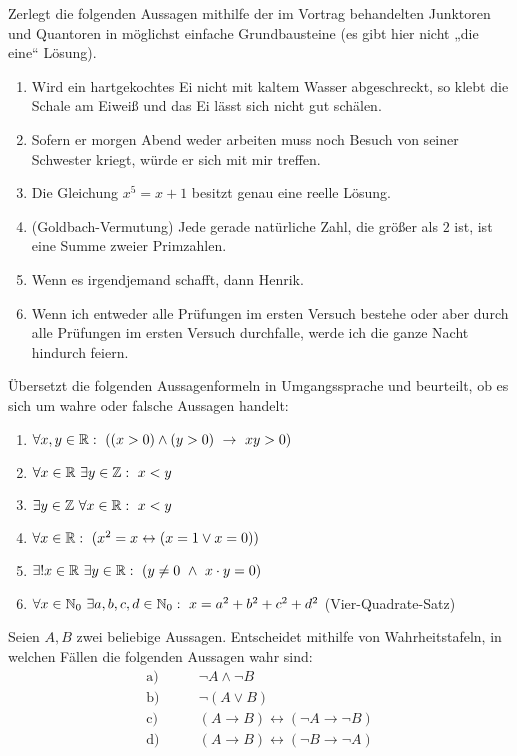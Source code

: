 \begin{aufg}
    Zerlegt die folgenden Aussagen mithilfe der im Vortrag behandelten Junktoren und Quantoren in möglichst einfache Grundbausteine (es gibt hier nicht „die eine“ Lösung).
    \begin{enumerate}
        \item Wird ein hartgekochtes Ei nicht mit kaltem Wasser abgeschreckt, so klebt die Schale am Eiweiß und das Ei lässt sich nicht gut schälen.
        \item Sofern er morgen Abend weder arbeiten muss noch Besuch von seiner Schwester kriegt, würde er sich mit mir treffen.
        \item Die Gleichung $x^5=x+1$ besitzt genau eine reelle Lösung.
        \item(Goldbach-Vermutung) Jede gerade natürliche Zahl, die größer als $2$ ist, ist eine Summe zweier Primzahlen.
        \item Wenn es irgendjemand schafft, dann Henrik.
        \item Wenn ich entweder alle Prüfungen im ersten Versuch bestehe oder aber durch alle Prüfungen im ersten Versuch durchfalle, werde ich die ganze Nacht hindurch feiern.
    \end{enumerate}
\end{aufg}


\begin{aufg}
    Übersetzt die folgenden Aussagenformeln in Umgangssprache und beurteilt, ob es sich um wahre oder falsche Aussagen handelt:
    \begin{enumerate}
        \item $\forall x,y\in \mathbb R:\ ((x>0)\land (y>0)\ \to\ xy>0)$
        \item $\forall x\in \R\ \exists y\in \Z:\ x<y$
        \item $\exists y\in \Z\ \forall x\in \R:\ x<y$
        \item $\forall x\in \mathbb R:\ (x^2 =x\leftrightarrow(x=1\vee x=0))$
        \item $\exists! x\in \R\ \exists y\in \R:\ (y\neq0\ \land\ x\cdot y=0)$
        \item $\forall x\in\mathbb N_0\ \exists a,b,c,d\in \mathbb N_0:\ x=a^2+b^2+c^2+d^2$ \quad (Vier-Quadrate-Satz)
    \end{enumerate}
\end{aufg}
	
	
\begin{aufg}[Wahrheitstafeln]
    Seien $A,B$ zwei beliebige Aussagen. Entscheidet mithilfe von Wahrheitstafeln, in welchen Fällen die folgenden Aussagen wahr sind:
    \begin{align*}
        \text{a)}&\qquad \neg A \land \neg B \\
        \text{b)}&\qquad \neg(A\lor B) \\
        \text{c)}&\qquad (A\to B)\leftrightarrow(\neg A \to \neg B) \\
        \text{d)}&\qquad (A\to B)\leftrightarrow(\neg B \to \neg A)
    \end{align*}
\end{aufg}


